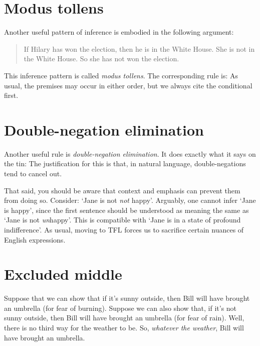 \section{Modus tollens}
Another useful pattern of inference is embodied in the following argument:
	\begin{quote}
		If Hilary has won the election, then he is in the White House. She is not in the White House. So she has not won the election.
	\end{quote}
This inference pattern is called \emph{modus tollens}. The corresponding rule is:
As usual, the premises may occur in either order, but we always cite the conditional first.

\section{Double-negation elimination}
Another useful rule is \emph{double-negation elimination}. It does exactly what it says on the tin:
The justification for this is that, in natural language, double-negations tend to cancel out.

That said, you should be aware that context and emphasis can prevent them from doing so. Consider: `Jane is not \emph{not} happy'. Arguably, one cannot infer `Jane is happy', since the first sentence should be understood as meaning the same as  `Jane is not \emph{un}happy'. This is compatible with `Jane is in a state of profound indifference'. As usual, moving to TFL forces us to sacrifice certain nuances of English expressions.

\section{Excluded middle}

Suppose that we can show that if it's sunny outside, then Bill will have brought an umbrella (for fear of burning). Suppose we can also show that, if it's not sunny outside, then Bill will have brought an umbrella (for fear of rain). Well, there is no third way for the weather to be. So, \emph{whatever the weather}, Bill will have brought an umbrella.

